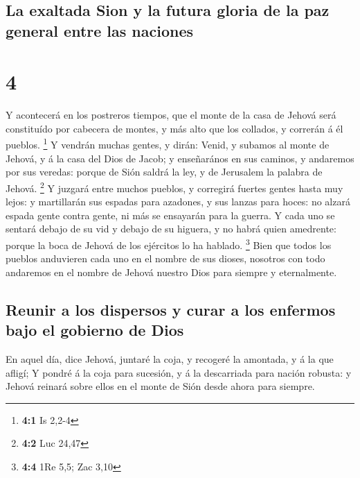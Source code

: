\hypertarget{la-exaltada-sion-y-la-futura-gloria-de-la-paz-general-entre-las-naciones}{%
\subsection{La exaltada Sion y la futura gloria de la paz general entre
las
naciones}\label{la-exaltada-sion-y-la-futura-gloria-de-la-paz-general-entre-las-naciones}}

\hypertarget{section-3}{%
\section{4}\label{section-3}}

 Y acontecerá en los postreros tiempos, que el monte de la
casa de Jehová será constituído por cabecera de montes, y más alto que
los collados, y correrán á él pueblos. \footnote{\textbf{4:1} Is 2,2-4}
 Y vendrán muchas gentes, y dirán: Venid, y subamos al
monte de Jehová, y á la casa del Dios de Jacob; y enseñarános en sus
caminos, y andaremos por sus veredas: porque de Sión saldrá la ley, y de
Jerusalem la palabra de Jehová. \footnote{\textbf{4:2} Luc 24,47}
 Y juzgará entre muchos pueblos, y corregirá fuertes
gentes hasta muy lejos: y martillarán sus espadas para azadones, y sus
lanzas para hoces: no alzará espada gente contra gente, ni más se
ensayarán para la guerra.  Y cada uno se sentará debajo de
su vid y debajo de su higuera, y no habrá quien amedrente: porque la
boca de Jehová de los ejércitos lo ha hablado. \footnote{\textbf{4:4}
  1Re 5,5; Zac 3,10}  Bien que todos los pueblos
anduvieren cada uno en el nombre de sus dioses, nosotros con todo
andaremos en el nombre de Jehová nuestro Dios para siempre y
eternalmente.

\hypertarget{reunir-a-los-dispersos-y-curar-a-los-enfermos-bajo-el-gobierno-de-dios}{%
\subsection{Reunir a los dispersos y curar a los enfermos bajo el
gobierno de
Dios}\label{reunir-a-los-dispersos-y-curar-a-los-enfermos-bajo-el-gobierno-de-dios}}

 En aquel día, dice Jehová, juntaré la coja, y recogeré la
amontada, y á la que afligí;  Y pondré á la coja para
sucesión, y á la descarriada para nación robusta: y Jehová reinará sobre
ellos en el monte de Sión desde ahora para siempre.

